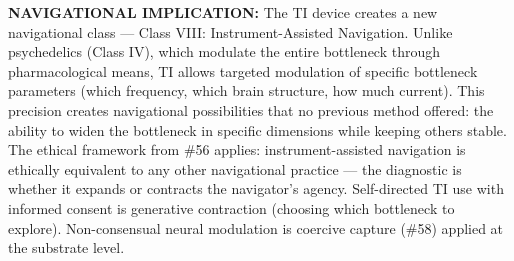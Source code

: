 \textbf{NAVIGATIONAL IMPLICATION:} The TI device creates a new navigational class — Class VIII: Instrument-Assisted Navigation. Unlike psychedelics (Class IV), which modulate the entire bottleneck through pharmacological means, TI allows targeted modulation of specific bottleneck parameters (which frequency, which brain structure, how much current). This precision creates navigational possibilities that no previous method offered: the ability to widen the bottleneck in specific dimensions while keeping others stable. The ethical framework from \#56 applies: instrument-assisted navigation is ethically equivalent to any other navigational practice — the diagnostic is whether it expands or contracts the navigator's agency. Self-directed TI use with informed consent is generative contraction (choosing which bottleneck to explore). Non-consensual neural modulation is coercive capture (\#58) applied at the substrate level.



\bigskip\noindent\makebox[\textwidth]{\color{rulegray}\rule{5cm}{0.3pt}}\bigskip
